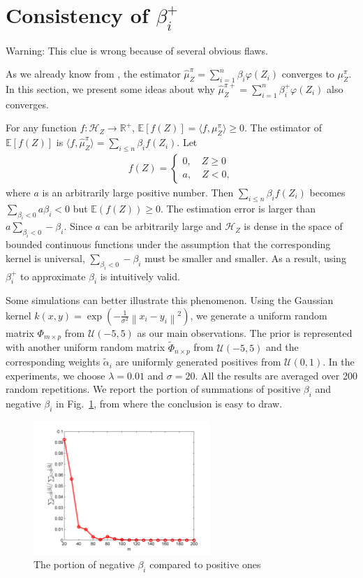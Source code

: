\documentclass[a4paper]{article}
\renewcommand{\cal}{\mathcal}
\newcommand{\bb}{\mathbb}
\newcommand{\norm}[1]{\left\lVert#1\right\rVert}
\newcommand{\figref}[1]{Fig.~\ref{#1}}
\begin{document}
\section{Consistency of $\beta_i^+$}
{\color{red} Warning: This clue is wrong because of several obvious flaws.}

As we already know from \cite{fukumizu2011kernel}, the estimator $\widehat{\mu}_Z^\pi = \sum_{i=1}^n\beta_i \varphi(Z_i)$ converges to $\mu_Z^\pi$. In this section, we present some ideas about why $\widehat{\mu}_Z^{\pi+} = \sum_{i=1}^n\beta_i^+ \varphi(Z_i)$ also converges.

For any function $f:\cal{H}_Z \rightarrow \bb{R}^+$, $\bb{E}[f(Z)] = \langle f,\mu_Z^\pi \rangle\geq 0$. The estimator of $\bb{E}[f(Z)]$ is $\langle f,\widehat{\mu}_Z^\pi \rangle = \sum_{i\leq n}\beta_i f(Z_i)$. Let 
\begin{align*}
f(Z) = \begin{cases}
0,\quad Z \geq 0\\
a,\quad Z < 0,
\end{cases}
\end{align*}
where $a$ is an arbitrarily large positive number. Then $\sum_{i\leq n} \beta_i f(Z_i)$ becomes $\sum_{\beta_i < 0} a \beta_i < 0$ but $\bb{E}(f(Z))\geq 0$. The estimation error is larger than $a\sum_{\beta_i<0}-\beta_i$. Since $a$ can be arbitrarily large and $\cal{H}_Z$ is dense in the space of bounded continuous functions under the assumption that the corresponding kernel is universal, $\sum_{\beta_i<0}-\beta_i$ must be smaller and smaller. As a result, using $\beta_i^+$ to approximate $\beta_i$ is intuitively valid.

Some simulations can better illustrate this phenomenon. Using the Gaussian kernel $k(x,y) = \exp\left( -\frac{1}{\sigma^2} \norm{x_i-y_i}^2 \right)$, we generate a uniform random matrix $\Phi_{m\times p}$ from $\cal{U}(-5,5)$ as our main observations. The prior is represented with another uniform random matrix $\tilde{\Phi}_{n\times p}$ from $\cal{U}(-5,5)$ and the corresponding weights $\tilde{\alpha}_i$ are uniformly generated positives from $\cal{U}(0,1)$. In the experiments, we choose $\lambda = 0.01$ and $\sigma = 20$. All the results are averaged over 200 random repetitions. We report the portion of summations of positive $\beta_i$ and negative $\beta_i$ in \figref{fig:beta}, from where the conclusion is easy to draw.

\begin{figure}
\centering
\caption{The portion of negative $\beta_i$ compared to positive ones}\label{fig:beta}
\includegraphics[width=0.6\textwidth]{beta.png}
\end{figure}
\end{document}
